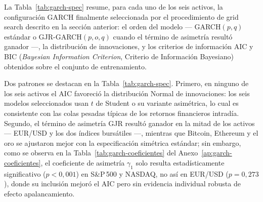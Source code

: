 \documentclass[12pt]{paper}
\begin{document}
La Tabla~\ref{tab:garch-spec} resume, para cada uno de los seis activos, la configuración GARCH finalmente seleccionada por el procedimiento de grid search descrito en la sección anterior: el orden del modelo --- GARCH$(p,q)$ estándar o GJR-GARCH$(p,o,q)$ cuando el término de asimetría resultó ganador ---, la distribución de innovaciones, y los criterios de información AIC y BIC (\textit{Bayesian Information Criterion}, Criterio de Información Bayesiano) obtenidos sobre el conjunto de entrenamiento.

\begin{table}[H]
\centering
\caption{Especificación GARCH seleccionada por activo (menor AIC entre las siete configuraciones evaluadas).}
\label{tab:garch-spec}
\end{table}

Dos patrones se destacan en la Tabla~\ref{tab:garch-spec}. Primero, en ninguno de los seis activos el AIC favoreció la distribución Normal de innovaciones: los seis modelos seleccionados usan $t$ de Student o su variante asimétrica, lo cual es consistente con las colas pesadas típicas de los retornos financieros intradía. Segundo, el término de asimetría GJR resultó ganador en la mitad de los activos --- EUR/USD y los dos índices bursátiles ---, mientras que Bitcoin, Ethereum y el oro se ajustaron mejor con la especificación simétrica estándar; sin embargo, como se observa en la Tabla~\ref{tab:garch-coeficientes} del Anexo~\ref{ap:garch-coeficientes}, el coeficiente de asimetría $\gamma_1$ solo resulta estadísticamente significativo ($p<0{,}001$) en S\&P\,500 y NASDAQ, no así en EUR/USD ($p=0{,}273$), donde su inclusión mejoró el AIC pero sin evidencia individual robusta de efecto apalancamiento.
\end{document}
